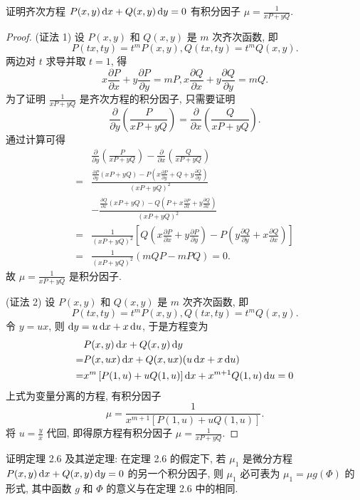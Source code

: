 \begin{exercise}
  证明齐次方程 $P(x,y)\mathop{}\!\mathrm{d} x+Q(x,y)\mathop{}\!\mathrm{d} y=0$ 有积分因子 $\mu=\frac{1}{xP+yQ}$.  
\end{exercise}

\begin{proof}
  (证法 1) 设 $P(x,y)$ 和 $Q(x,y)$ 是 $m$ 次齐次函数, 即
  \[P (tx,ty)=t^mP(x,y),Q(tx,ty)=t^mQ(x,y).\]
  两边对 $t$ 求导并取 $t=1$, 得
  \[x\frac{\partial P}{\partial x}+y\frac{\partial P}{\partial y}
    = mP,x\frac{\partial Q}{\partial x}+y\frac{\partial Q}{\partial y}=mQ.\]
  为了证明 $\frac{1}{xP+yQ}$ 是齐次方程的积分因子, 只需要证明
  \[\frac{\partial}{\partial y}\left(\frac{P}{xP+yQ}\right)
    = \frac{\partial}{\partial x}\left(\frac{Q}{xP+yQ}\right).\]
  通过计算可得
  \[\begin{split}
  &\frac{\partial}{\partial y}\left(\frac{P}{xP+yQ}\right)-\frac{\partial}{\partial x}\left(\frac{Q}{xP+yQ}\right)\\
  =&\frac{\frac{\partial P}{\partial y}(xP+yQ)-P\left(x\frac{\partial P}{\partial y}+Q+y\frac{\partial Q}{\partial y}\right)}{(xP+yQ)^2}\\
  &-\frac{\frac{\partial Q}{\partial x}(xP+yQ)-Q\left(P+x\frac{\partial P}{\partial x}+y\frac{\partial Q}{\partial x}\right)}{(xP+yQ)^2}\\
  =&\frac{1}{(xP+yQ)^2}\left[Q\left(x\frac{\partial P}{\partial x}+y\frac{\partial P}{\partial y}\right)-P\left(y\frac{\partial Q}{\partial y}+x\frac{\partial Q}{\partial x}\right)\right]\\
  =&\frac{1}{(xP+yQ)^2}(mQP-mPQ)=0.
  \end{split}\]
  故 $\mu=\frac{1}{xP+yQ}$ 是积分因子.

  (证法 2) 设 $P(x,y)$ 和 $Q(x,y)$ 是 $m$ 次齐次函数, 即
  \[P(tx,ty)=t^mP(x,y),Q(tx,ty)=t^mQ(x,y).\]
  令 $y=ux$, 则 $\mathop{}\!\mathrm{d} y=u\mathop{}\!\mathrm{d} x+x\mathop{}\!\mathrm{d} u$, 于是方程变为
  \[\begin{split}
  &P(x,y)\mathop{}\!\mathrm{d} x+Q(x,y)\mathop{}\!\mathrm{d} y\\
  =&P(x,ux)\mathop{}\!\mathrm{d} x+Q(x,ux)(u\mathop{}\!\mathrm{d} x+x\mathop{}\!\mathrm{d} u)\\
  =&x^m\left[P(1,u)+uQ(1,u)\right]\mathop{}\!\mathrm{d} x+x^{m+1}Q(1,u)\mathop{}\!\mathrm{d} u=0
  \end{split}\]
  上式为变量分离的方程, 有积分因子
  \[\mu=\frac{1}{x^{m+1}[P(1,u)+uQ(1,u)]}.\]
  将 $u=\frac{y}{x}$ 代回, 即得原方程有积分因子 $\mu=\frac{1}{xP+yQ}$.
\end{proof}



\begin{exercise}
  证明定理 2.6 及其逆定理: 在定理 2.6 的假定下,
  若 $\mu_1$ 是微分方程 $P(x,y)\mathop{}\!\mathrm{d} x+Q(x,y)\mathop{}\!\mathrm{d} y=0$ 的另一个积分因子,
  则 $\mu_1$ 必可表为 $\mu_1=\mu g(\varPhi)$ 的形式, 其中函数 $g$ 和 $\varPhi$ 的意义与在定理 2.6 中的相同.
\end{exercise}


